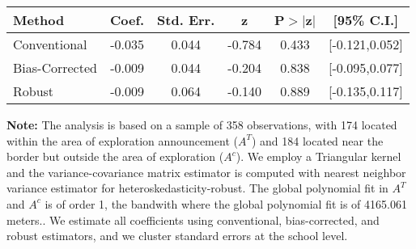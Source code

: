 \begin{table}[htbp]\centering
 \footnotesize 
\begin{tabular}{lccccc}
\hline\hline
Method & Coef. & Std. Err. & z & P$>|$z$|$ & [95\% C.I.] \\ 
\hline \hline  
Conventional & -0.035 & 0.044 & -0.784 & 0.433 & [-0.121,0.052] \\ 
 Bias-Corrected & -0.009 & 0.044 & -0.204 & 0.838 & [-0.095,0.077] \\ 
Robust & -0.009 & 0.064 & -0.140 & 0.889 & [-0.135,0.117] \\ 
  \hline\hline
\end{tabular}
\label{table:rd}
\begin{tablenotes} 
  \justifying \tiny \textbf{Note: }    
   The analysis is based on a sample of 358 observations, with 174 located within the area of exploration announcement ($A^{T}$) and 184 located near the border but outside the area of exploration  ($A^{c}$). 
           We employ a Triangular kernel and the variance-covariance matrix estimator is computed with nearest neighbor variance estimator for heteroskedasticity-robust. The global polynomial fit in  $A^{T}$ and $A^{c}$ is of order 1, the bandwith where the global polynomial fit is of 4165.061 meters.. We estimate all coefficients using conventional, bias-corrected, and robust estimators, and we cluster standard errors at the school level. \end{tablenotes} 
 \end{table} 
